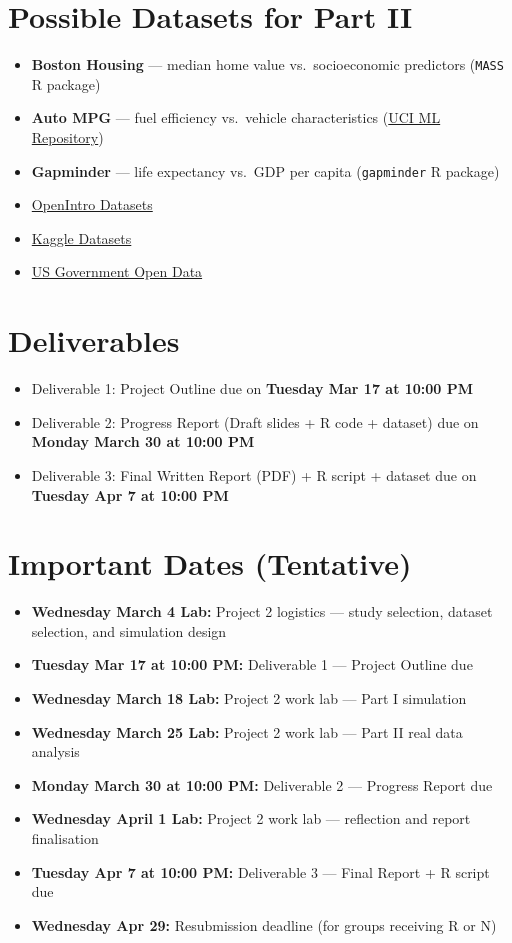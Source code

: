 \documentclass[12pt]{article}
\begin{document}
\section*{Possible Datasets for Part II}
\begin{itemize}
    \item \textbf{Boston Housing} --- median home value vs.\ socioeconomic predictors (\texttt{MASS} R package)
    \item \textbf{Auto MPG} --- fuel efficiency vs.\ vehicle characteristics (\href{https://archive.ics.uci.edu/}{UCI ML Repository})
    \item \textbf{Gapminder} --- life expectancy vs.\ GDP per capita (\texttt{gapminder} R package)
    \item \href{https://www.openintro.org/data/}{OpenIntro Datasets}
    \item \href{https://www.kaggle.com/datasets}{Kaggle Datasets}
    \item \href{https://data.gov/}{US Government Open Data}
\end{itemize}


\section*{Deliverables}
\begin{itemize}
    \item Deliverable 1: Project Outline due on \textbf{Tuesday Mar 17 at 10:00 PM}
    \item Deliverable 2: Progress Report (Draft slides + R code + dataset) due on \textbf{Monday March 30 at 10:00 PM}
    \item Deliverable 3: Final Written Report (PDF) + R script + dataset due on \textbf{Tuesday Apr 7 at 10:00 PM}
\end{itemize}


\section*{Important Dates (Tentative)}
\begin{itemize}
    \item \textbf{Wednesday March 4 Lab:} Project 2 logistics --- study selection, dataset selection, and simulation design
    \item \textbf{Tuesday Mar 17 at 10:00 PM:} Deliverable 1 --- Project Outline due
    \item \textbf{Wednesday March 18 Lab:} Project 2 work lab --- Part I simulation
    \item \textbf{Wednesday March 25 Lab:} Project 2 work lab --- Part II real data analysis
    \item \textbf{Monday March 30 at 10:00 PM:} Deliverable 2 --- Progress Report due
    \item \textbf{Wednesday April 1 Lab:} Project 2 work lab --- reflection and report finalisation
    \item \textbf{Tuesday Apr 7 at 10:00 PM:} Deliverable 3 --- Final Report + R script due
    \item \textbf{Wednesday Apr 29:} Resubmission deadline (for groups receiving R or N)
\end{itemize}
\end{document}
